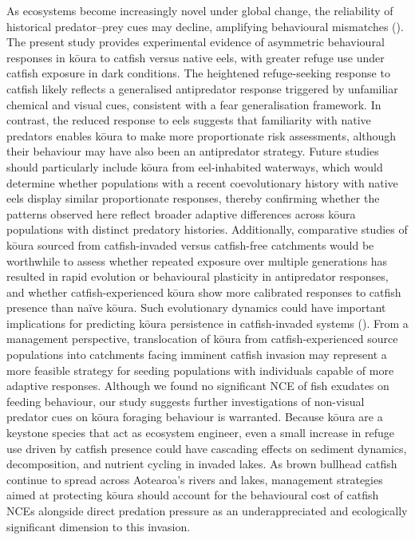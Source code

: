 \documentclass[
  letterpaper,
  DIV=11,
  numbers=noendperiod]{scrartcl}
\begin{document}
As ecosystems become increasingly novel under global change, the
reliability of historical predator--prey cues may decline, amplifying
behavioural mismatches (). The
present study provides experimental evidence of asymmetric behavioural
responses in kōura to catfish versus native eels, with greater refuge
use under catfish exposure in dark conditions. The heightened
refuge-seeking response to catfish likely reflects a generalised
antipredator response triggered by unfamiliar chemical and visual cues,
consistent with a fear generalisation framework. In contrast, the
reduced response to eels suggests that familiarity with native predators
enables kōura to make more proportionate risk assessments, although
their behaviour may have also been an antipredator strategy. Future
studies should particularly include kōura from eel-inhabited waterways,
which would determine whether populations with a recent coevolutionary
history with native eels display similar proportionate responses,
thereby confirming whether the patterns observed here reflect broader
adaptive differences across kōura populations with distinct predatory
histories. Additionally, comparative studies of kōura sourced from
catfish-invaded versus catfish-free catchments would be worthwhile to
assess whether repeated exposure over multiple generations has resulted
in rapid evolution or behavioural plasticity in antipredator responses,
and whether catfish-experienced kōura show more calibrated responses to
catfish presence than naïve kōura. Such evolutionary dynamics could have
important implications for predicting kōura persistence in
catfish-invaded systems (). From
a management perspective, translocation of kōura from
catfish-experienced source populations into catchments facing imminent
catfish invasion may represent a more feasible strategy for seeding
populations with individuals capable of more adaptive responses.
Although we found no significant NCE of fish exudates on feeding
behaviour, our study suggests further investigations of non-visual
predator cues on kōura foraging behaviour is warranted. Because kōura
are a keystone species that act as ecosystem engineer, even a small
increase in refuge use driven by catfish presence could have cascading
effects on sediment dynamics, decomposition, and nutrient cycling in
invaded lakes. As brown bullhead catfish continue to spread across
Aotearoa's rivers and lakes, management strategies aimed at protecting
kōura should account for the behavioural cost of catfish NCEs alongside
direct predation pressure as an underappreciated and ecologically
significant dimension to this invasion.
\end{document}
